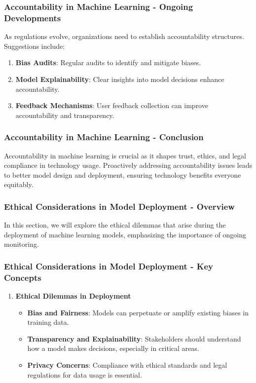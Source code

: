 \documentclass[aspectratio=169]{beamer}
\begin{document}
\begin{frame}[fragile]
    \frametitle{Accountability in Machine Learning - Ongoing Developments}
    As regulations evolve, organizations need to establish accountability structures. Suggestions include:
    
    \begin{enumerate}
        \item \textbf{Bias Audits}: Regular audits to identify and mitigate biases.
        \item \textbf{Model Explainability}: Clear insights into model decisions enhance accountability.
        \item \textbf{Feedback Mechanisms}: User feedback collection can improve accountability and transparency.
    \end{enumerate}
\end{frame}

\begin{frame}[fragile]
    \frametitle{Accountability in Machine Learning - Conclusion}
    Accountability in machine learning is crucial as it shapes trust, ethics, and legal compliance in technology usage. Proactively addressing accountability issues leads to better model design and deployment, ensuring technology benefits everyone equitably.
\end{frame}

\begin{frame}[fragile]
    \frametitle{Ethical Considerations in Model Deployment - Overview}
    In this section, we will explore the ethical dilemmas that arise during the deployment of machine learning models, emphasizing the importance of ongoing monitoring.
\end{frame}

\begin{frame}[fragile]
    \frametitle{Ethical Considerations in Model Deployment - Key Concepts}
    \begin{enumerate}
        \item \textbf{Ethical Dilemmas in Deployment}
        \begin{itemize}
            \item \textbf{Bias and Fairness}: Models can perpetuate or amplify existing biases in training data.
            \item \textbf{Transparency and Explainability}: Stakeholders should understand how a model makes decisions, especially in critical areas.
            \item \textbf{Privacy Concerns}: Compliance with ethical standards and legal regulations for data usage is essential.
        \end{itemize}
    \end{enumerate}
\end{frame}
\end{document}
